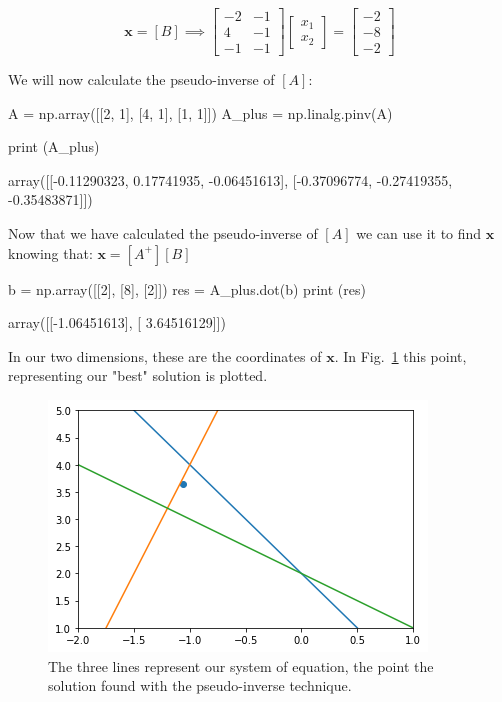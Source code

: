 \begin{equation*}
[A]\boldsymbol{x}=[B]\implies 
\begin{bmatrix}
−2&-1\\
4&-1\\
−1&−1\end{bmatrix}
\begin{bmatrix}
x_1\\
x_2\end{bmatrix}=
\begin{bmatrix}
−2\\
−8\\
−2\end{bmatrix}
\end{equation*}

We will now calculate the pseudo-inverse of $[A]$:

\begin{ipython}
A = np.array([[2, 1], [4, 1], [1, 1]])
A_plus = np.linalg.pinv(A)

print (A_plus)
\end{ipython}
\begin{ioutput}
array([[-0.11290323,  0.17741935, -0.06451613],
       [-0.37096774, -0.27419355, -0.35483871]])
\end{ioutput}

Now that we have calculated the pseudo-inverse of $[A]$ we can use it to find $\boldsymbol{x}$ knowing that: $\boldsymbol{x}=[A^+] [B]$

\begin{ipython}
b = np.array([[2], [8], [2]])
res = A_plus.dot(b)
print (res)
\end{ipython}
\begin{ioutput}
array([[-1.06451613],
       [ 3.64516129]])
\end{ioutput}

In our two dimensions, these are the coordinates of $\boldsymbol{x}$. In Fig.~\ref{fig:overdet_system} this point, representing our "best" solution is plotted.

\begin{figure}[htb]
	\centering
	\includegraphics[width=0.7\linewidth]{figures/overdet_system}
	\caption{The three lines represent our system of equation, the point 
		the solution found with the pseudo-inverse technique.}
	\label{fig:overdet_system}
\end{figure}

